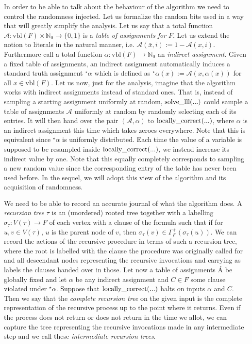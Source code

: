 \documentclass[11pt,a4paper]{article}
\newcommand{\Function}[2]
	{ \mbox{\rm #1}(#2)}
\begin{document}
In order to be able to talk about the behaviour
of the algorithm we need to control the randomness injected. Let us formalize the random bits used
in a way that will greatly simplify the analysis. Let us say that a total function 
$\mathcal{A} : \mbox{vbl}(F) \times \mathbb{N}_0 \rightarrow \{0,1\}$ is a \emph{table of assignments for $F$}.
Let us extend the notion to literals in the natural manner, i.e. $\mathcal{A}(\bar x, i) := 1-\mathcal{A}(x,i)$.
Furthermore call a total function $\alpha : \mbox{vbl}(F) \rightarrow \mathbb{N}_0$ an
\emph{indirect assignment}. Given a fixed table of assignments, an indirect assignment
automatically induces a standard truth assignment $^\star \alpha$ which is defined as
$^\star \alpha(x) := \mathcal{A}(x,\alpha(x))$ for all $x \in \mbox{vbl}(F)$. Let us now, just for
the analysis, imagine that the algorithm works with indirect assignments instead of standard
ones. That is, instead of sampling a starting assignment uniformly at random, $\Function{solve\_lll}{...}$
could sample a table of assignments $\mathcal{A}$ uniformly at random by randomly selecting each
of its entries. It will then hand over the pair $(\mathcal{A},\alpha)$ to $\Function{locally\_correct}{...}$,
where $\alpha$ is an indirect assignment this time which takes zeroes everywhere. Note that this
is equivalent since $^\star \alpha$ is uniformly distributed. Each time
the value of a variable is supposed to be resampled inside $\Function{locally\_correct}{...}$, we instead
increase its indirect value by one. Note that this equally completely corresponds to sampling a new
random value since the corresponding entry of the table has never been used before. In the sequel, we will
adopt this view of the algorithm and its acquisition of randomness.

We need to be able to record an accurate journal of what the algorithm does. A \emph{recursion tree} $\tau$ is
an (unordered) rooted tree together with a labelling $\sigma_\tau : V(\tau) \rightarrow F$ of each
vertex with a clause of the formula such that if for $u,v \in V(\tau)$, $u$ is the parent node of $v$, then
$\sigma_\tau(v) \in \Gamma_F^+(\sigma_\tau(u))$. We can record the actions of the recursive procedure
in terms of such a recursion tree, where the root is labelled with the clause the procedure was originally
called for and all descendant nodes representing the recursive invocations and carrying as labels the
clauses handed over in those. Let now a table of assignments $\mathcal{Á}$ be globally fixed and 
let $\alpha$ be any indirect assignment and $C \in F$ some clause violated under $^\star \alpha$. 
Suppose that $\Function{locally\_correct}{...}$ halts on inputs $\alpha$ and $C$. Then we say that the 
\emph{complete recursion tree} on the given input is the complete representation of the recursive process
up to the point where it returns. Even if the process does not return or does not return in the time we
allot, we can capture the tree representing the recursive invocations made in any intermediate step and
we call these \emph{intermediate recursion trees}.
\end{document}
